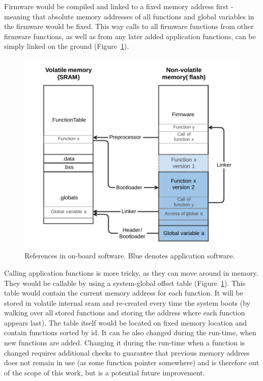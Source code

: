 Firmware would be compiled and linked to a fixed memory address first - meaning that absolute memory addresses of all functions and global variables in the firmware would be fixed. This way calls to all firmware functions from other firmware functions, as well as from any later added application functions, can be simply linked on the ground (Figure~\ref{fig:swLink}).

\begin{figure}[t]
	\centering
	\includegraphics[width=\textwidth]{figures/Software_linking.pdf}
	\caption{References in on-board software. Blue denotes application software.}
	\label{fig:swLink}
\end{figure}

Calling application functions is more tricky, as they can move around in memory. They would be callable by using a system-global offset table (Figure~\ref{fig:swLink}). This table would contain the current memory address for each function. It will be stored in volatile internal \gls{sram} and re-created every time the system boots (by walking over all stored functions and storing the address where each function appears last). The table itself would be located on fixed memory location and contain functions sorted by id. It can be also changed during the run-time, when new functions are added. Changing it during the run-time when a function is changed requires additional checks to guarantee that previous memory address does not remain in use (as some function pointer somewhere) and is therefore out of the scope of this work, but is a potential future improvement.

